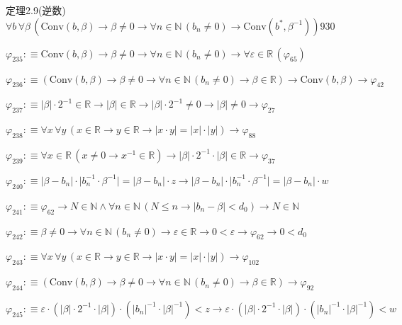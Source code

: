 \begin{fullproof}{定理2.9(逆数)}{$\forall b\,\forall \beta\,(\mathrm{Conv}(b,\beta) \to \beta \neq 0 \to \forall n \in \mathbb{N}\,(b_{n} \neq 0) \to \mathrm{Conv}(b^{\ast},\beta^{-1}))$}{930}
\begin{abbrevlist}
\item $\varphi_{235} :\equiv \mathrm{Conv}(b,\beta) \to \beta \neq 0 \to \forall n \in \mathbb{N}\,(b_{n} \neq 0) \to \forall \varepsilon \in \mathbb{R}\,(\varphi_{65})$
\item $\varphi_{236} :\equiv (\mathrm{Conv}(b,\beta) \to \beta \neq 0 \to \forall n \in \mathbb{N}\,(b_{n} \neq 0) \to \beta \in \mathbb{R}) \to \mathrm{Conv}(b,\beta) \to \varphi_{42}$
\item $\varphi_{237} :\equiv \lvert \beta \rvert \cdot 2^{-1} \in \mathbb{R} \to \lvert \beta \rvert \in \mathbb{R} \to \lvert \beta \rvert \cdot 2^{-1} \neq 0 \to \lvert \beta \rvert \neq 0 \to \varphi_{27}$
\item $\varphi_{238} :\equiv \forall x\,\forall y\,(x \in \mathbb{R} \to y \in \mathbb{R} \to \lvert x \cdot y \rvert = \lvert x \rvert \cdot \lvert y \rvert) \to \varphi_{88}$
\item $\varphi_{239} :\equiv \forall x \in \mathbb{R}\,(x \neq 0 \to x^{-1} \in \mathbb{R}) \to \lvert \beta \rvert \cdot 2^{-1} \cdot \lvert \beta \rvert \in \mathbb{R} \to \varphi_{37}$
\item $\varphi_{240} :\equiv \lvert \beta - b_{n} \rvert \cdot \lvert b_{n}^{-1} \cdot \beta^{-1} \rvert = \lvert \beta - b_{n} \rvert \cdot z \to \lvert \beta - b_{n} \rvert \cdot \lvert b_{n}^{-1} \cdot \beta^{-1} \rvert = \lvert \beta - b_{n} \rvert \cdot w$
\item $\varphi_{241} :\equiv \varphi_{62} \to N \in \mathbb{N} \land \forall n \in \mathbb{N}\,(N \leq n \to \lvert b_{n} - \beta \rvert < d_{0}) \to N \in \mathbb{N}$
\item $\varphi_{242} :\equiv \beta \neq 0 \to \forall n \in \mathbb{N}\,(b_{n} \neq 0) \to \varepsilon \in \mathbb{R} \to 0 < \varepsilon \to \varphi_{62} \to 0 < d_{0}$
\item $\varphi_{243} :\equiv \forall x\,\forall y\,(x \in \mathbb{R} \to y \in \mathbb{R} \to \lvert x \cdot y \rvert = \lvert x \rvert \cdot \lvert y \rvert) \to \varphi_{102}$
\item $\varphi_{244} :\equiv (\mathrm{Conv}(b,\beta) \to \beta \neq 0 \to \forall n \in \mathbb{N}\,(b_{n} \neq 0) \to \beta \in \mathbb{R}) \to \varphi_{92}$
\item $\varphi_{245} :\equiv \varepsilon \cdot (\lvert \beta \rvert \cdot 2^{-1} \cdot \lvert \beta \rvert) \cdot (\lvert b_{n} \rvert^{-1} \cdot \lvert \beta \rvert^{-1}) < z \to \varepsilon \cdot (\lvert \beta \rvert \cdot 2^{-1} \cdot \lvert \beta \rvert) \cdot (\lvert b_{n} \rvert^{-1} \cdot \lvert \beta \rvert^{-1}) < w$

\end{abbrevlist}
\end{fullproof}
